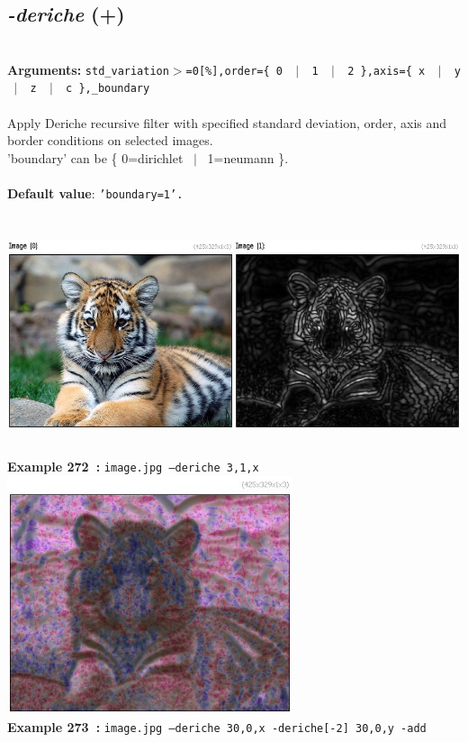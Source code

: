 \documentclass[a4paper,11pt,twoside]{book}
\begin{document}
\subsection{\emph{-deriche} (+)}\vspace*{-0.5em}
~\\\textbf{Arguments: } 
{\small \texttt{std\_variation$>$=0[\%],order=\{ 0 ~$|$~ 1 ~$|$~ 2 \},axis=\{ x ~$|$~ y ~$|$~ z ~$|$~ c \},\_boundary}}\\~\\
Apply Deriche recursive filter with specified standard deviation, order, axis and border
conditions on selected images.
~\\'boundary' can be \{ 0=dirichlet ~$|$~ 1=neumann \}.
~\\~\\\textbf{Default value}: {\small \texttt{'boundary=1'.}}
\begin{center}\includegraphics[keepaspectratio=true,height=7cm,width=\textwidth]{img/gmic_def272.jpg}\\
{\footnotesize \textbf{Example 272~:} \texttt{image.jpg --deriche 3,1,x}}
\\\includegraphics[keepaspectratio=true,height=7cm,width=\textwidth]{img/gmic_def273.jpg}\\
{\footnotesize \textbf{Example 273~:} \texttt{image.jpg --deriche 30,0,x -deriche[-2] 30,0,y -add}}
\end{center}
\end{document}
